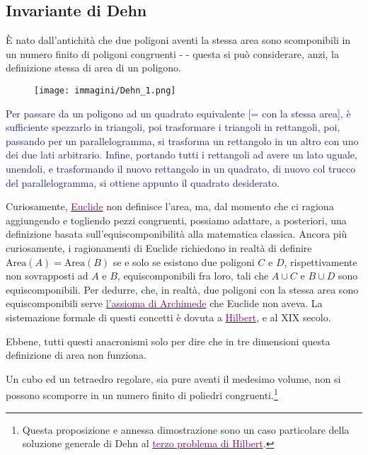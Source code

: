 \documentclass[11pt]{scrartcl}
\begin{document}
\subsection{Invariante di Dehn}

È nato dall'antichità che due poligoni aventi la stessa area sono scomponibili in un numero finito di poligoni congruenti -  - questa si può considerare, anzi, la definizione stessa di area di un poligono.

\begin{figure}[H]
	\centering
	\texttt{[image: immagini/Dehn\_1.png]}
\end{figure}

\textcolor{MidnightBlue}{Per passare da un poligono ad un quadrato equivalente [= con la stessa area], è sufficiente spezzarlo in triangoli, poi trasformare i triangoli in rettangoli, poi, passando per un parallelogramma, si trasforma un rettangolo in un altro con uno dei due lati arbitrario.
Infine, portando tutti i rettangoli ad avere un lato uguale, unendoli, e trasformando il nuovo rettangolo in un quadrato, di nuovo col trucco del parallelogramma, si ottiene appunto il quadrato desiderato.}

\begin{note}
	Curiosamente, \href{https://en.wikipedia.org/wiki/Euclid}{\textcolor{purple}{Euclide}} non definisce l'area, ma, dal momento che ci ragiona aggiungendo e togliendo pezzi congruenti, possiamo adattare, a posteriori, una definizione basata sull'equiscomponibilità alla matematica classica.
	Ancora più curiosamente, i ragionamenti di Euclide richiedono in realtà di definire $\text{Area}(A) = \text{Area}(B)$ se e solo se esistono due poligoni $C$ e $D$, rispettivamente non sovrapposti ad $A$ e $B$, equiscomponibili fra loro, tali che $A \cup C$ e $B \cup D$
	sono equiscomponibili. Per dedurre, che, in realtà, due poligoni con la stessa area sono equiscomponibili serve \href{https://en.wikipedia.org/wiki/Archimedean_property}{\textcolor{purple}{l'assioma di Archimede}} che Euclide non aveva. La sistemazione formale di questi concetti è dovuta 
	a \href{https://en.wikipedia.org/wiki/David_Hilbert}{\textcolor{purple}{Hilbert}}, e al XIX secolo.
\end{note}

Ebbene, tutti questi anacronismi solo per dire che in tre dimensioni questa definizione di area non funziona.

\begin{theorem}
	Un cubo ed un tetraedro regolare, sia pure aventi il medesimo volume, non si possono scomporre in un numero finito di poliedri congruenti.\footnote{Questa proposizione
	e annessa dimostrazione sono un caso particolare della soluzione generale di Dehn al \href{https://en.wikipedia.org/wiki/Hilbert\%27s_third_problem}{\textcolor{purple}{terzo problema di Hilbert}}.}
\end{theorem}
\end{document}
